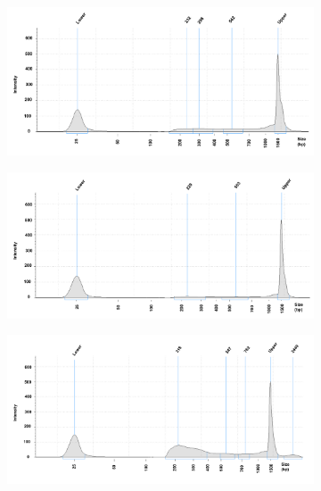 \begin{figure}[htbp]
\centering
\begin{subfigure}{0.70\textwidth}
\centering
\includegraphics[width=\textwidth]{./Appendix/pdfs/Chapter3/FAST_ATAC_skin_tapestation_C1}
\caption{\textbf{}}
\end{subfigure}
\begin{subfigure}{0.70\textwidth}
\centering
\includegraphics[width=\textwidth]{./Appendix/pdfs/Chapter3/FAST_ATAC_skin_tapestation_C3}
\caption{\textbf{}}
\end{subfigure}
\begin{subfigure}{0.70\textwidth}
\centering
\includegraphics[width=\textwidth]{./Appendix/pdfs/Chapter3/FAST_ATAC_skin_tapestation_C4}

\end{subfigure}
\end{figure}
